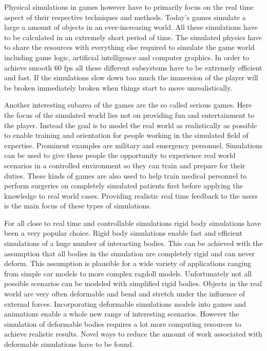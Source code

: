 Physical simulations in games however have to primarily focus on the real time aspect of their respective techniques and methods. Today's games simulate a large a amount of objects in an ever-increasing world. All these simulations have to be calculated in an extremely short period of time. The simulated physics have to share the resources with everything else required to simulate the game world including game logic, artificial intelligence and computer graphics. In order to achieve smooth 60 fps all these different subsystems have to be extremely efficient and fast. If the simulations slow down too much the immersion of the player will be broken immediately broken when things start to move unrealistically.

Another interesting subarea of the games are the so called serious games. Here the focus of the simulated world lies not on providing fun and entertainment to the player. Instead the goal is to model the real world as realistically as possible to enable training and orientation for people working in the simulated field of expertise. Prominent examples are military and emergency personnel. Simulations can be used to give these people the opportunity to experience real world scenarios in a controlled environment so they can train and prepare for their duties. These kinds of games are also used to help train medical personnel to perform surgeries on completely simulated patients first before applying the knowledge to real world cases. Providing realistic real time feedback to the users is the main focus of these types of simulations.

For all close to real time and controllable simulations rigid body simulations have been a very popular choice. Rigid body simulations enable fast and efficient simulations of a huge number of interacting bodies. This can be achieved with the assumption that all bodies in the simulation are completely rigid and can never deform. This assumption is plausible for a wide variety of applications ranging from simple car models to more complex ragdoll models. Unfortunately not all possible scenarios can be modeled with simplified rigid bodies. Objects in the real world are very often deformable and bend and stretch under the influence of external forces. Incorporating deformable simulations models into games and animations enable a whole new range of interesting scenarios. However the simulation of deformable bodies requires a lot more computing resources to achieve realistic results. Novel ways to reduce the amount of work associated with deformable simulations have to be found.

